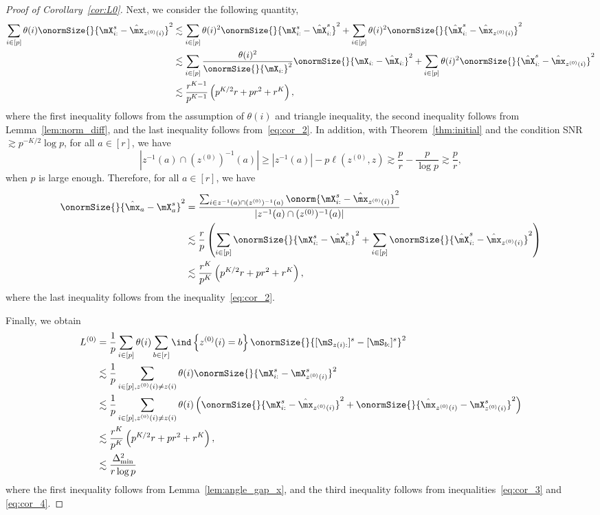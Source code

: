 \documentclass[lettersize,onecolumn,journal]{IEEEtran}
\theoremstyle{definition}
\theoremstyle{definition}
\newcommand{\of}[1]{\left(#1\right)}
\newcommand{\offf}[1]{\left\{#1\right\}}
\begin{document}
\begin{proof} [Proof of Corollary~\ref{cor:L0}]
Next, we consider the following quantity,
\begin{align}
    \sum_{i \in [p]} \theta(i) \onormSize{}{ \mX_{i:}^s - \hat \mx_{z^{(0)}(i)}}^2 &\lesssim \sum_{i \in [p]} \theta(i)^2 \onormSize{}{\mX_{i:}^s - \hat \mX_{i:}^s}^2 + \sum_{i \in [p]} \theta(i)^2 \onormSize{}{\hat \mX_{i:}^s - \hat \mx_{z^{(0)}(i)} }^2\\
    & \lesssim \sum_{i \in [p]} \frac{ \theta(i)^2}{ \onormSize{}{\mX_{i:}}^2} \onormSize{}{\mX_{i:}  - \hat \mX_{i:}}^2 +  \sum_{i \in [p]} \theta(i)^2 \onormSize{}{\hat \mX_{i:}^s - \hat \mx_{z^{(0)}(i)} }^2\\
    & \lesssim \frac{r^{K-1}}{p^{K-1}} \of{ p^{K/2}r + pr^2 + r^K} ,\label{eq:cor_3}
\end{align}
where the first inequality follows from the assumption of $\theta(i)$ and triangle inequality, the second inequality follows from Lemma~\ref{lem:norm_diff}, and the last inequality follows from~\eqref{eq:cor_2}. In addition, with Theorem~\ref{thm:initial} and the condition SNR $\gtrsim p^{-K/2} \log p$, for all $a \in [r]$, we have
\begin{equation}
    |z^{-1}(a) \cap (z^{(0)})^{-1} (a)| \geq |z^{-1}(a)| - p\ell(z^{(0)} ,  z) \gtrsim \frac{p}{r} - \frac{p}{\log p} \gtrsim \frac{p}{r},
\end{equation}
when $p$ is large enough. Therefore, for all $a \in [r]$, we have 
\begin{align}
       \onormSize{}{ \hat \mx_{a} - \mX_{a}^s  }^2  &= \frac{ \sum_{i \in z^{-1}(a) \cap (z^{(0)})^{-1} (a) } \onorm{ \mX_{i:}^s - \hat \mx_{z^{(0)}(i)}}^2 }{|z^{-1}(a) \cap (z^{(0)})^{-1} (a) |}  \\
       & \lesssim \frac{r}{p} \of{  \sum_{i \in [p]} \onormSize{}{ \mX_{i:}^s - \hat \mX_{i:}^s }^2 + \sum_{i \in [p]} \onormSize{}{\hat \mX_{i:}^s - \hat \mx_{z^{(0)}(i)}}^2 } \\
       & \lesssim  \frac{r^{K}}{p^{K}}\of{ p^{K/2}r + pr^2 + r^K}, \label{eq:cor_4}
\end{align}
where the last inequality follows from the inequality~\eqref{eq:cor_2}.

Finally, we obtain 
\begin{align}
     L^{(0)} &= \frac{1}{p}  \sum_{i \in [p]} \theta(i) \sum_{b \in [r]}  \ind \offf{ z^{(0)}(i) = b } \onormSize{}{ [ \mS_{  z(i):}  ]^s - [ \mS_{b:}  ]^s  }^2 \\
     & \lesssim \frac{1}{p}  \sum_{i \in [p], z^{(0)}(i) \neq z(i)} \theta(i)  \onormSize{}{ \mX_{i:}^s -  \mX_{z^{(0)}(i)}^s  }^2\\
     & \lesssim \frac{1}{p}  \sum_{i \in [p], z^{(0)}(i) \neq z(i)} \theta(i) \of{ \onormSize{}{\mX_{i:}^s - \hat \mx_{z^{(0)}(i)}}^2 + \onormSize{}{ \hat \mx_{z^{(0)}(i)} - \mX_{z^{(0)}(i)}^s  }^2 } \\
     & \lesssim \frac{r^{K}}{p^{K}} \of{ p^{K/2}r + pr^2 + r^K}, \\
     & \lesssim \frac{\Delta_{\min}^2}{r \log p}
\end{align}
where the first inequality follows from Lemma~\ref{lem:angle_gap_x}, and the third inequality follows from inequalities~\eqref{eq:cor_3} and \eqref{eq:cor_4}.
\end{proof}
\end{document}
